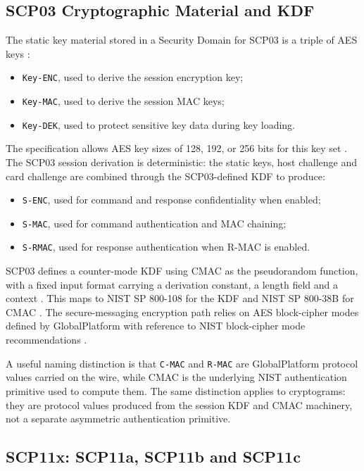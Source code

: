 \subsection{SCP03 Cryptographic Material and KDF}

The static key material stored in a Security Domain for SCP03 is a triple of
AES keys :
\begin{itemize}
\item \texttt{Key-ENC}, used to derive the session encryption key;
\item \texttt{Key-MAC}, used to derive the session MAC keys;
\item \texttt{Key-DEK}, used to protect sensitive key data during key loading.
\end{itemize}

The specification allows AES key sizes of 128, 192, or 256 bits for this key
set . The SCP03 session derivation is deterministic: the
static keys, host challenge and card challenge are combined through the
SCP03-defined KDF to produce:
\begin{itemize}
\item \texttt{S-ENC}, used for command and response confidentiality when
      enabled;
\item \texttt{S-MAC}, used for command authentication and MAC chaining;
\item \texttt{S-RMAC}, used for response authentication when R-MAC is enabled.
\end{itemize}

SCP03 defines a counter-mode KDF using CMAC as the pseudorandom function, with
a fixed input format carrying a derivation constant, a length field and a
context . This maps to NIST SP 800-108 for the KDF
\cite{nist800108} and NIST SP 800-38B for CMAC \cite{nist80038b}. The
secure-messaging encryption path relies on AES block-cipher modes defined by
GlobalPlatform with reference to NIST block-cipher mode recommendations
\cite{nist80038a}.

A useful naming distinction is that \texttt{C-MAC} and \texttt{R-MAC} are
GlobalPlatform protocol values carried on the wire, while CMAC is the
underlying NIST authentication primitive used to compute them. The same
distinction applies to cryptograms: they are protocol values produced from the
session KDF and CMAC machinery, not a separate asymmetric authentication
primitive.

\subsection{SCP11x: SCP11a, SCP11b and SCP11c}

